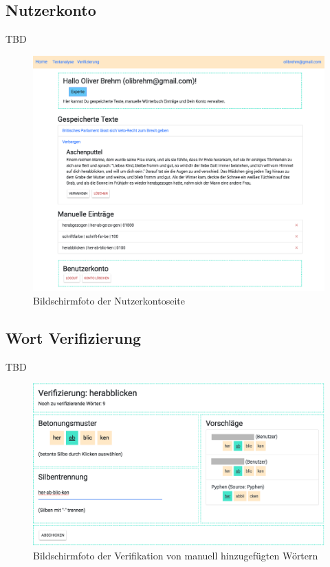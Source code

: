 \subsection{Nutzerkonto}

TBD
\begin{figure}[h!]
	\centering
	\includegraphics[width=.8\linewidth, frame]{figures/frontend/user-account}
	\caption{Bildschirmfoto der Nutzerkontoseite}
	\label{fig:frontend-useraccount}
\end{figure}

\subsection{Wort Verifizierung}

TBD
\begin{figure}[h!]
	\centering
	\includegraphics[width=.8\linewidth]{figures/frontend/verifizierung}
	\caption{Bildschirmfoto der Verifikation von manuell hinzugefügten Wörtern}
	\label{fig:frontend-verification}
\end{figure}